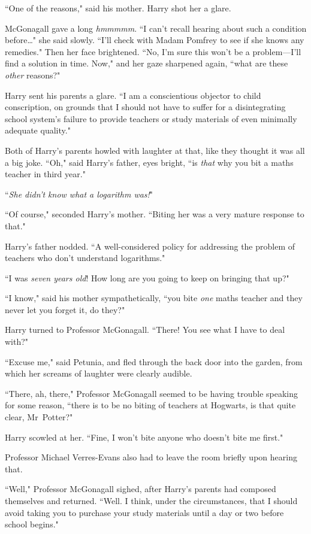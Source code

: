``One of the reasons," said his mother. Harry shot her a glare.

McGonagall gave a long \emph{hmmmmm}. ``I can't recall hearing about such a condition before{\ldots}" she said slowly. ``I'll check with Madam Pomfrey to see if she knows any remedies." Then her face brightened. ``No, I'm sure this won't be a problem—I'll find a solution in time. Now," and her gaze sharpened again, ``what are these \emph{other} reasons?"

Harry sent his parents a glare. ``I am a conscientious objector to child conscription, on grounds that I should not have to suffer for a disintegrating school system's failure to provide teachers or study materials of even minimally adequate quality."

Both of Harry's parents howled with laughter at that, like they thought it was all a big joke. ``Oh," said Harry's father, eyes bright, ``is \emph{that} why you bit a maths teacher in third year."

``\emph{She didn't know what a logarithm was!}"

``Of course," seconded Harry's mother. ``Biting her was a very mature response to that."

Harry's father nodded. ``A well-considered policy for addressing the problem of teachers who don't understand logarithms."

``I was \emph{seven years old}! How long are you going to keep on bringing that up?"

``I know," said his mother sympathetically, ``you bite \emph{one} maths teacher and they never let you forget it, do they?"

Harry turned to Professor McGonagall. ``There! You see what I have to deal with?"

``Excuse me," said Petunia, and fled through the back door into the garden, from which her screams of laughter were clearly audible.

``There, ah, there," Professor McGonagall seemed to be having trouble speaking for some reason, ``there is to be no biting of teachers at Hogwarts, is that quite clear, Mr~Potter?"

Harry scowled at her. ``Fine, I won't bite anyone who doesn't bite me first."

Professor Michael Verres-Evans also had to leave the room briefly upon hearing that.

``Well," Professor McGonagall sighed, after Harry's parents had composed themselves and returned. ``Well. I think, under the circumstances, that I should avoid taking you to purchase your study materials until a day or two before school begins."

